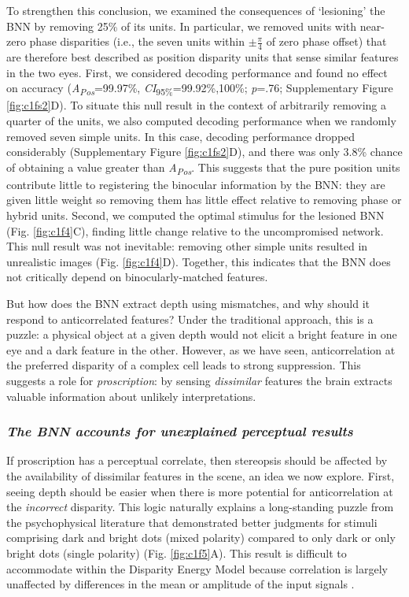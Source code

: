 {To strengthen this conclusion, we examined the consequences of `lesioning' the BNN by removing 25\% of its units. In particular, we removed units with near-zero phase disparities (i.e., the seven units within $\pm \frac{\pi}{4}$ of zero phase offset) that are therefore best described as position disparity units that sense similar features in the two eyes. First, we considered decoding performance and found no effect on accuracy ({\it A\textsubscript{Pos}}=99.97\%, {\it CI}\textsubscript{95\%}=99.92\%,100\%; {\it p}=.76; Supplementary Figure \ref{fig:c1fs2}D). To situate this null result in the context of arbitrarily removing a quarter of the units, we also computed decoding performance when we randomly removed seven simple units. In this case, decoding performance dropped considerably (Supplementary Figure \ref{fig:c1fs2}D), and there was only 3.8\% chance of obtaining a value greater than {\it A\textsubscript{Pos}}. This suggests that the pure position units contribute little to registering the binocular information by the BNN: they are given little weight so removing them has little effect relative to removing phase or hybrid units. Second, we computed the optimal stimulus for the lesioned BNN (Fig. \ref{fig:c1f4}C), finding little change relative to the uncompromised network. This null result was not inevitable: removing other simple units resulted in unrealistic images (Fig. \ref{fig:c1f4}D). Together, this indicates that the BNN does not critically depend on binocularly-matched features.

But how does the BNN extract depth using mismatches, and why should it respond to anticorrelated features? Under the traditional approach, this is a puzzle: a physical object at a given depth would not elicit a bright feature in one eye and a dark feature in the other. However, as we have seen, anticorrelation at the preferred disparity of a complex cell leads to strong suppression. This suggests a role for \emph {proscription}: by sensing \emph {dissimilar} features the brain extracts valuable information about unlikely interpretations.

\subsubsection*{\textit{The BNN accounts for unexplained perceptual results}}

 If proscription has a perceptual correlate, then stereopsis should be affected by the availability of dissimilar features in the scene, an idea we now explore. First, seeing depth should be easier when there is more potential for anticorrelation at the \emph {incorrect} disparity. This logic naturally explains a long-standing puzzle from the psychophysical literature \cite{Harris:1995va, Read:2011im} that demonstrated better judgments for stimuli comprising dark and bright dots (mixed polarity) compared to only dark or only bright dots (single polarity) (Fig. \ref{fig:c1f5}A). This result is difficult to accommodate within the Disparity Energy Model because correlation is largely unaffected by differences in the mean or amplitude of the input signals \cite{Read:2011im}.

}
